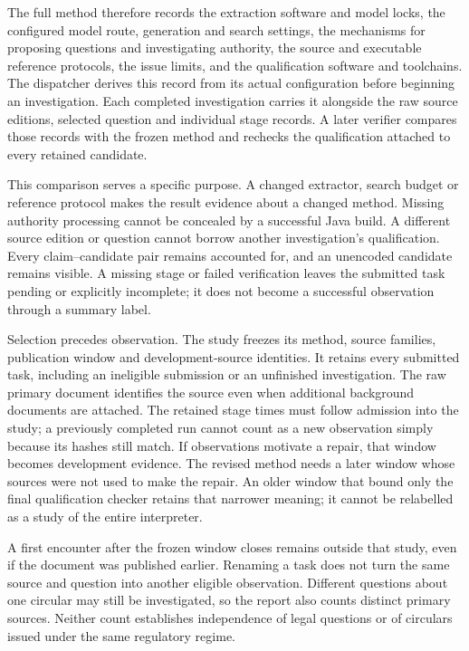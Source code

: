 The full method therefore records the extraction software and model locks,
the configured model route, generation and search settings, the mechanisms
for proposing questions and investigating authority, the source and executable
reference protocols, the issue limits, and the qualification software and
toolchains. The dispatcher derives this record from its actual configuration
before beginning an investigation. Each completed investigation carries it
alongside the raw source editions, selected question and individual stage
records. A later verifier compares those records with the frozen method and
rechecks the qualification attached to every retained candidate.

This comparison serves a specific purpose. A changed extractor, search budget
or reference protocol makes the result evidence about a changed method.
Missing authority processing cannot be concealed by a successful Java build.
A different source edition or question cannot borrow another investigation's
qualification. Every claim--candidate pair remains accounted for, and an
unencoded candidate remains visible. A missing stage or failed verification
leaves the submitted task pending or explicitly incomplete; it does not become
a successful observation through a summary label.

Selection precedes observation. The study freezes its method, source families,
publication window and development-source identities. It retains every
submitted task, including an ineligible submission or an unfinished
investigation. The raw primary document identifies the source even when
additional background documents are attached. The retained stage times must
follow admission into the study; a previously completed run cannot count as
a new observation simply because its hashes still match. If observations
motivate a repair, that window becomes
development evidence. The revised method needs a later window whose sources
were not used to make the repair. An older window that bound only the final
qualification checker retains that narrower meaning; it cannot be relabelled
as a study of the entire interpreter.

A first encounter after the frozen window closes remains outside that study,
even if the document was published earlier. Renaming a task does not turn the
same source and question into another eligible observation. Different
questions about one circular may still be investigated, so the report also
counts distinct primary sources. Neither count establishes independence of
legal questions or of circulars issued under the same regulatory regime.

